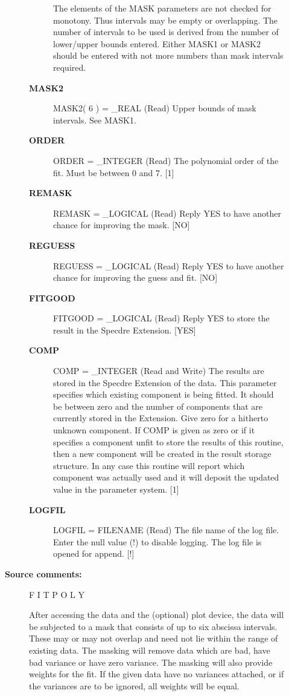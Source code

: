 \begin{description}
\begin{description}
\begin{description}
   The elements of the MASK parameters are not checked for
   monotony. Thus intervals may be empty or overlapping. The
   number of intervals to be used is derived from the number of
   lower/upper bounds entered. Either MASK1 or MASK2 should be
   entered with not more numbers than mask intervals required.
\item [\textbf{MASK2}]
MASK2( 6 ) = \_REAL (Read)
   Upper bounds of mask intervals. See MASK1.
\item [\textbf{ORDER}]
ORDER = \_INTEGER (Read)
   The polynomial order of the fit. Must be between 0 and 7. [1]
\item [\textbf{REMASK}]
REMASK = \_LOGICAL (Read)
   Reply YES to have another chance for improving the mask.
   [NO]
\item [\textbf{REGUESS}]
REGUESS = \_LOGICAL (Read)
   Reply YES to have another chance for improving the guess and
   fit. [NO]
\item [\textbf{FITGOOD}]
FITGOOD = \_LOGICAL (Read)
   Reply YES to store the result in the Specdre Extension. [YES]
\item [\textbf{COMP}]
COMP = \_INTEGER (Read and Write)
   The results are stored in the Specdre Extension of the data.
   This parameter specifies which existing component is being
   fitted. It should be between zero and the number of components
   that are currently stored in the Extension. Give zero for a
   hitherto unknown component. If COMP is given as zero or if it
   specifies a component unfit to store the results of this
   routine, then a new component will be created in the result
   storage structure. In any case this routine will report which
   component was actually used and it will deposit the updated
   value in the parameter system. [1]
\item [\textbf{LOGFIL}]
LOGFIL = FILENAME (Read)
   The file name of the log file. Enter the null value (!) to
   disable logging. The log file is opened for append. [!]

\end{description}

\item [\textbf{Source comments:}]
\begin{terminalv}
   F I T P O L Y

   After accessing the data and the (optional) plot device, the data
   will be subjected to a mask that consists of up to six abscissa
   intervals. These may or may not overlap and need not lie within
   the range of existing data. The masking will remove data which are
   bad, have bad variance or have zero variance. The masking will
   also provide weights for the fit. If the given data have no
   variances attached, or if the variances are to be ignored, all
   weights will be equal.


\end{terminalv}
\end{description}
\end{description}
